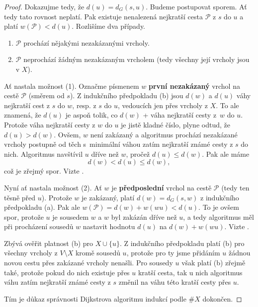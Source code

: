 \begin{proof}
 Dokazujme tedy, že $d(u) = d_G(s,u)$. Budeme postupovat sporem. Ať tedy tato
 rovnost neplatí. Pak existuje nenalezená nejkratší cesta $\mathcal{P}$ z $s$ do
 $u$ a platí $w(\mathcal{P}) < d(u)$. Rozlišíme dva případy.
 \begin{enumerate}[label=(\arabic*)]
  \item $\mathcal{P}$ prochází nějakými nezakázanými vrcholy.
  \item $\mathcal{P}$ neprochází žádným nezakázaným vrcholem (tedy všechny její
   vrcholy jsou v $X$).
 \end{enumerate}
 Ať nastala možnost (1). Označme písmenem $w$ \textbf{první nezakázaný} vrchol
 na cestě $\mathcal{P}$ (směrem od $s$). Z indukčního předpokladu (b) jsou
 $d(w)$ a $d(u)$ váhy nejkratší cest z $s$ do $w$, resp. z $s$ do $u$, vedoucích
 jen přes vrcholy z $X$. To ale znamená, že $d(u)$ je aspoň tolik, co $d(w)$ +
 váha nejkratší cesty z~$w$ do $u$. Protože váha nejkratší cesty z $w$ do $u$ je
 jistě kladné číslo, plyne odtud, že $d(u) > d(w)$. Ovšem, $w$ není zakázaný a
 algoritmus prochází nezakázané vrcholy postupně od těch s~minimální váhou zatím
 nejkratší známé cesty z $s$ do nich. Algoritmus navštívil $u$ dříve než $w$,
 pročež $d(u) \leq d(w)$. Pak ale máme
 \[
  d(w) < d(u) \leq d(w),
 \]
 což je zřejmý spor. Vizte .

 Nyní ať nastala možnost (2). Ať $w$ je \textbf{předposlední} vrchol na cestě
 $\mathcal{P}$ (tedy ten těsně před $u$). Protože $w$ je zakázaný, platí $d(w) =
 d_G(s,w)$ z indukčního předpokladu (a). Pak ale $w(\mathcal{P}) = d(w) + w(wu)
 < d(u)$. To je ovšem spor, protože $u$ je sousedem $w$ a $w$ byl zakázán dříve
 než $u$, a tedy algoritmus měl při procházení sousedů $w$ nastavit hodnotu
 $d(u)$ na $d(w) + w(wu)$. Vizte
 .

 Zbývá ověřit platnost (b) pro $X \cup \{u\}$. Z indukčního předpokladu platí
 (b) pro všechny vrcholy z $V \setminus X$ kromě sousedů $u$, protože pro ty
 jsme přidáním $u$ žádnou novou cestu přes zakázané vrcholy nenašli. Pro sousedy
 $u$ však platí (b) zřejmě také, protože pokud do nich existuje přes $u$ kratší
 cesta, tak u nich algoritmus váhu zatím nejkratší známé cesty z $s$ změnil na
 váhu této kratší cesty přes $u$.

 Tím je důkaz správnosti Dijkstrova algoritmu indukcí podle $\# X$ dokončen.
\end{proof}

